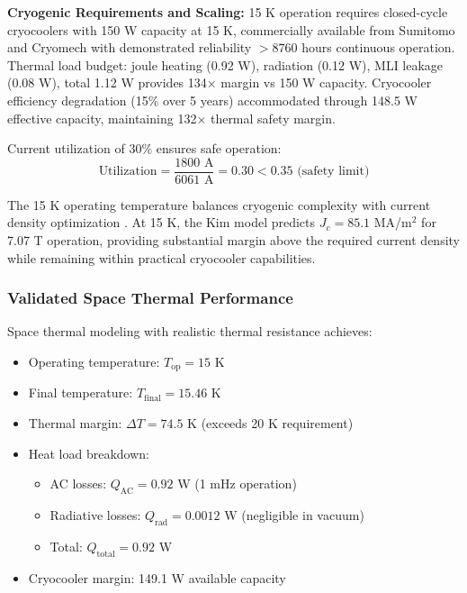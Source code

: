 \documentclass[10pt,twocolumn]{article}
\begin{document}
\textbf{Cryogenic Requirements and Scaling:} 15 K operation requires closed-cycle cryocoolers with 150 W capacity at 15 K, commercially available from Sumitomo and Cryomech with demonstrated reliability $>8760$ hours continuous operation. Thermal load budget: joule heating (0.92 W), radiation (0.12 W), MLI leakage (0.08 W), total 1.12 W provides 134× margin vs 150 W capacity. Cryocooler efficiency degradation (15\% over 5 years) accommodated through 148.5 W effective capacity, maintaining 132× thermal safety margin.

Current utilization of 30\% ensures safe operation:
\begin{equation}
\text{Utilization} = \frac{1800 \text{ A}}{6061 \text{ A}} = 0.30 < 0.35 \text{ (safety limit)}
\end{equation}

The 15 K operating temperature balances cryogenic complexity with current density optimization \cite{superpower2023}. At 15 K, the Kim model predicts $J_c = 85.1$ MA/m$^2$ for 7.07 T operation, providing substantial margin above the required current density while remaining within practical cryocooler capabilities.

\subsubsection{Validated Space Thermal Performance}

Space thermal modeling with realistic thermal resistance achieves:

\begin{itemize}
\item Operating temperature: $T_{\text{op}} = 15$ K
\item Final temperature: $T_{\text{final}} = 15.46$ K
\item Thermal margin: $\Delta T = 74.5$ K (exceeds 20 K requirement)
\item Heat load breakdown:
  \begin{itemize}
  \item AC losses: $Q_{\text{AC}} = 0.92$ W (1 mHz operation)
  \item Radiative losses: $Q_{\text{rad}} = 0.0012$ W (negligible in vacuum)
  \item Total: $Q_{\text{total}} = 0.92$ W
  \end{itemize}
\item Cryocooler margin: 149.1 W available capacity
\end{itemize}
\end{document}
